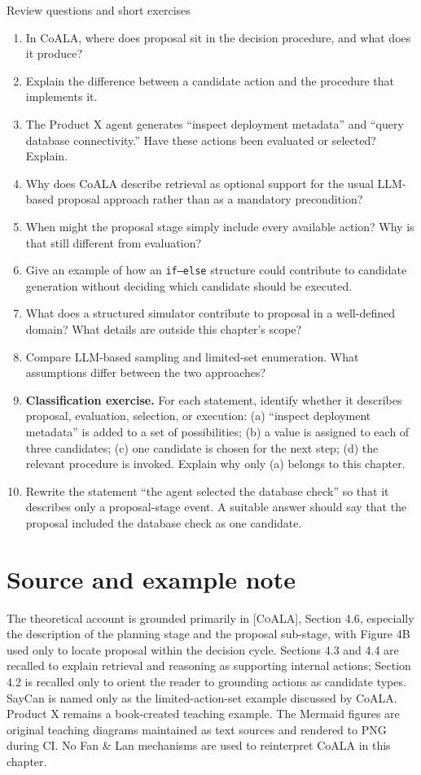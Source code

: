 \begin{reviewquestions}{Review questions and short exercises}
\begin{enumerate}
  \item In CoALA, where does proposal sit in the decision procedure, and what does it produce?
  \item Explain the difference between a candidate action and the procedure that implements it.
  \item The Product X agent generates ``inspect deployment metadata'' and ``query database connectivity.'' Have these actions been evaluated or selected? Explain.
  \item Why does CoALA describe retrieval as optional support for the usual LLM-based proposal approach rather than as a mandatory precondition?
  \item When might the proposal stage simply include every available action? Why is that still different from evaluation?
  \item Give an example of how an \texttt{if--else} structure could contribute to candidate generation without deciding which candidate should be executed.
  \item What does a structured simulator contribute to proposal in a well-defined domain? What details are outside this chapter's scope?
  \item Compare LLM-based sampling and limited-set enumeration. What assumptions differ between the two approaches?
  \item \textbf{Classification exercise.} For each statement, identify whether it describes proposal, evaluation, selection, or execution: (a) ``inspect deployment metadata'' is added to a set of possibilities; (b) a value is assigned to each of three candidates; (c) one candidate is chosen for the next step; (d) the relevant procedure is invoked. Explain why only (a) belongs to this chapter.
  \item Rewrite the statement ``the agent selected the database check'' so that it describes only a proposal-stage event. A suitable answer should say that the proposal included the database check as one candidate.
\end{enumerate}
\end{reviewquestions}

\section*{Source and example note}
The theoretical account is grounded primarily in \textsc{[CoALA]}, Section 4.6, especially the description of the planning stage and the proposal sub-stage, with Figure 4B used only to locate proposal within the decision cycle. Sections 4.3 and 4.4 are recalled to explain retrieval and reasoning as supporting internal actions; Section 4.2 is recalled only to orient the reader to grounding actions as candidate types. SayCan is named only as the limited-action-set example discussed by CoALA. Product X remains a book-created teaching example. The Mermaid figures are original teaching diagrams maintained as text sources and rendered to PNG during CI. No Fan \& Lan mechanisms are used to reinterpret CoALA in this chapter.
